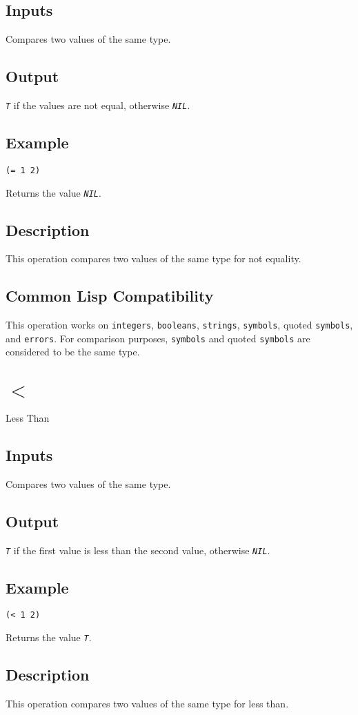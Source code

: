\documentclass[10pt, openany]{book}
\newcommand{\constant}[1]{\emph{\texttt{#1}}}
\newcommand{\datatype}[1]{\texttt{#1}}
\begin{document}
\subsection{Inputs}
Compares two values of the same type.
\subsection{Output}
\constant{T} if the values are not equal, otherwise \constant{NIL}.
\subsection{Example}
\begin{lstlisting}
(= 1 2)
\end{lstlisting}
Returns the value \constant{NIL}.
\subsection{Description}
This operation compares two values of the same type for not equality.
\subsection{Common Lisp Compatibility}
This operation works on \datatype{integers}, \datatype{booleans}, \datatype{strings}, \datatype{symbols}, quoted \datatype{symbols}, and \datatype{errors}.  For comparison purposes, \datatype{symbols} and quoted \datatype{symbols} are considered to be the same type.

\section{$<$}
Less Than
\subsection{Inputs}
Compares two values of the same type.
\subsection{Output}
\constant{T} if the first value is less than the second value, otherwise \constant{NIL}.
\subsection{Example}
\begin{lstlisting}
(< 1 2)
\end{lstlisting}
Returns the value \constant{T}.
\subsection{Description}
This operation compares two values of the same type for less than.
\end{document}
